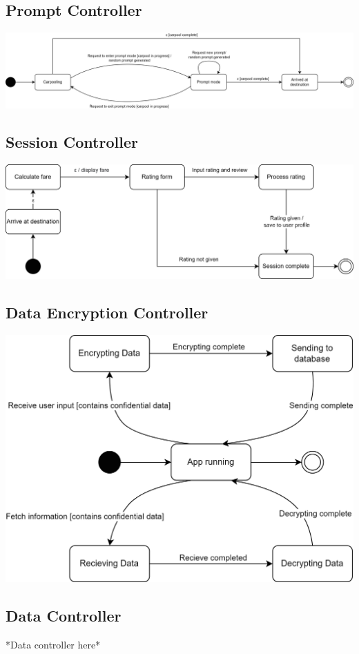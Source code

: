 \documentclass[]{article}
\begin{document}
\subsection*{Prompt Controller}
\includegraphics[scale=0.65]{StateCharts/Prompts.png}

\subsection*{Session Controller}
\includegraphics{StateCharts/Session.png}

\subsection*{Data Encryption Controller}
\includegraphics{StateCharts/DataEncryption.png}

\subsection*{Data Controller}
*Data controller here*
\end{document}
